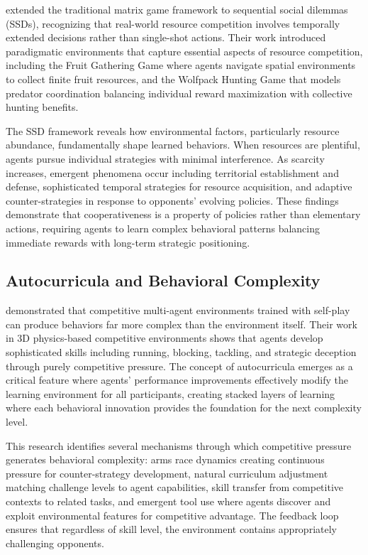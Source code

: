 \textcite{leibo_multi-agent_2017} extended the traditional matrix game framework to sequential social dilemmas (SSDs), recognizing that real-world resource competition involves temporally extended decisions rather than single-shot actions. Their work introduced paradigmatic environments that capture essential aspects of resource competition, including the Fruit Gathering Game where agents navigate spatial environments to collect finite fruit resources, and the Wolfpack Hunting Game that models predator coordination balancing individual reward maximization with collective hunting benefits.

The SSD framework reveals how environmental factors, particularly resource abundance, fundamentally shape learned behaviors. When resources are plentiful, agents pursue individual strategies with minimal interference. As scarcity increases, emergent phenomena occur including territorial establishment and defense, sophisticated temporal strategies for resource acquisition, and adaptive counter-strategies in response to opponents' evolving policies. These findings demonstrate that cooperativeness is a property of policies rather than elementary actions, requiring agents to learn complex behavioral patterns balancing immediate rewards with long-term strategic positioning.

\subsection{Autocurricula and Behavioral Complexity}

\textcite{bansal_emergent_2018} demonstrated that competitive multi-agent environments trained with self-play can produce behaviors far more complex than the environment itself. Their work in 3D physics-based competitive environments shows that agents develop sophisticated skills including running, blocking, tackling, and strategic deception through purely competitive pressure. The concept of autocurricula emerges as a critical feature where agents' performance improvements effectively modify the learning environment for all participants, creating stacked layers of learning where each behavioral innovation provides the foundation for the next complexity level.

This research identifies several mechanisms through which competitive pressure generates behavioral complexity: arms race dynamics creating continuous pressure for counter-strategy development, natural curriculum adjustment matching challenge levels to agent capabilities, skill transfer from competitive contexts to related tasks, and emergent tool use where agents discover and exploit environmental features for competitive advantage. The feedback loop ensures that regardless of skill level, the environment contains appropriately challenging opponents.

